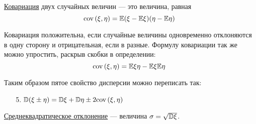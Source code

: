 \documentclass[../TV&MS.tex]{subfiles}
\begin{document}
\begin{Def}
\underline{Ковариация} двух случайных величин --- это величина, равная
$$ {\rm cov \,}(\xi,\eta) = \mathbb{E}(\xi - \mathbb{E}\xi)(\eta - \mathbb{E}\eta)$$
\end{Def}

Ковариация положительна, если случайные величины одновременно отклоняются в одну сторону и отрицательная, если в разные. Формулу ковариации так же можно упростить, раскрыв скобки в определении:
$${\rm cov \,}(\xi,\eta) = \mathbb{E}\xi\eta - \mathbb{E}\xi\mathbb{E}\eta$$

Таким образом пятое свойство дисперсии можно переписать так:
\begin{itemize}
	\item[5.] $\mathbb{D}(\xi \pm \eta) = \mathbb{D}\xi + \mathbb{D}\eta \pm 2{\rm cov \,}(\xi,\eta)$
\end{itemize}

\begin{Def}
\underline{Среднеквадратическое отклонение} --- величина $\sigma = \sqrt{\mathbb{D}\xi}$.
\end{Def}



\newpage
\end{document}
